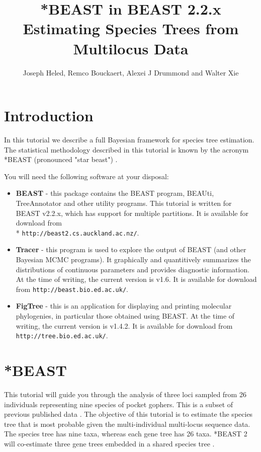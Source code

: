 \documentclass{article}
\newcommand{\BEASTVersion}{2.2.x}
\newcommand{\TracerVersion}{1.6}
\newcommand{\FigTreeVersion}{1.4.2}
\begin{document}
\title{*BEAST in BEAST {\BEASTVersion}\\
Estimating Species Trees from Multilocus Data}

\author{Joseph Heled, Remco Bouckaert, Alexei J Drummond and Walter Xie}

\maketitle

\section{Introduction}

In this tutorial we describe a full Bayesian framework for species tree estimation. The statistical methodology described in this tutorial is known by the acronym *BEAST (pronounced "star beast") \cite{Heled:2010fk}.

You will need the following software at your disposal:

\begin{itemize}

\item {\bf BEAST} - this package contains the BEAST program, BEAUti, TreeAnnotator and other utility programs. This tutorial is written for BEAST v{\BEASTVersion}, which has support for multiple partitions. It is available for download from \\* \texttt{http://beast2.cs.auckland.ac.nz/}.
\item {\bf Tracer} - this program is used to explore the output of BEAST (and other Bayesian MCMC programs). It graphically and
quantitively summarizes the distributions of continuous parameters and provides diagnostic information. At the time of
writing, the current version is v{\TracerVersion}. It is available for download from \texttt{http://beast.bio.ed.ac.uk/}.
\item {\bf FigTree} - this is an application for displaying and printing molecular phylogenies, in particular those obtained using
BEAST. At the time of writing, the current version is v{\FigTreeVersion}. It is available for download from \texttt{http://tree.bio.ed.ac.uk/}.
\end{itemize}

\section{*BEAST}

This tutorial will guide you through the analysis of three loci sampled from 26 individuals representing nine species of pocket gophers. This is a subset of previous published data \cite{belfiore2008multilocus}. The objective of this tutorial is to estimate the species tree that is most probable given the multi-individual multi-locus sequence data. The species tree has nine taxa, whereas each gene tree has 26 taxa. *BEAST 2 will co-estimate three gene trees embedded in a shared species tree \cite[for details]{Heled:2010fk}.
\end{document}
